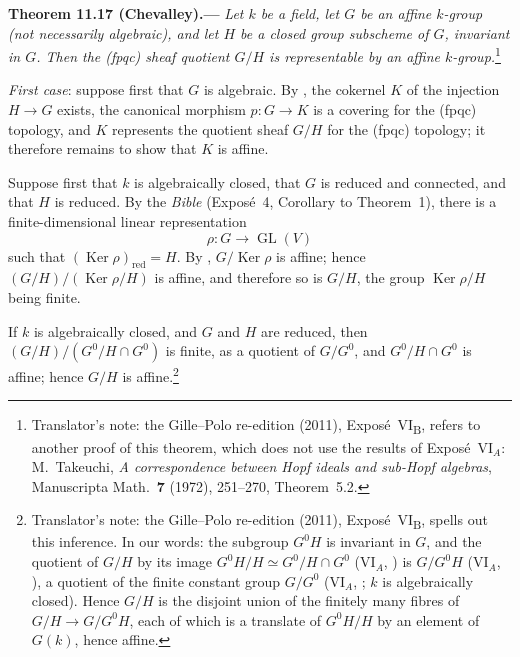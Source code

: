 
\medskip
{}\label{thm:sga3-VIB-11.17}%
\noindent\textbf{Theorem 11.17 \textup{(Chevalley)}.---}
\emph{Let \(k\) be a field, let \(G\) be an affine
\(k\)-group \textup{(not necessarily algebraic)}, and
let \(H\) be a closed group subscheme of \(G\), invariant
in \(G\). Then the \textup{(fpqc)} sheaf quotient \(G/H\)
is representable by an affine \(k\)-group.}\footnote{Translator's note: the Gille--Polo re-edition
(2011), Expos\'e~VI\textsubscript{B}, refers to another proof of this theorem, which does not use the results of
Expos\'e~VI\(_A\): M.~Takeuchi, \emph{A correspondence between Hopf ideals and sub-Hopf algebras}, Manuscripta
Math.\ \textbf{7} (1972), 251--270, Theorem~5.2.}

\emph{First case}: suppose first that \(G\) is algebraic. By
, the cokernel \(K\) of the injection
\(H\to G\) exists, the canonical morphism \(p:G\to K\) is a covering for the
\textup{(fpqc)} topology, and \(K\) represents the quotient sheaf \(G/H\) for the
\textup{(fpqc)} topology; it therefore remains to show that \(K\) is affine.

Suppose first that \(k\) is algebraically closed, that \(G\) is reduced and
connected, and that \(H\) is reduced. By the \emph{Bible} \textup{(Expos\'e~4,
Corollary to Theorem~1)}, there is a finite-dimensional linear representation
\[
  \rho:G\longrightarrow\operatorname{GL}(V)
\]
such that \((\operatorname{Ker}\rho)_{\mathrm{red}}=H\). By
, \(G/\operatorname{Ker}\rho\) is affine;
hence \((G/H)/(\operatorname{Ker}\rho/H)\) is affine, and therefore so is \(G/H\),
the group \(\operatorname{Ker}\rho/H\) being finite.

If \(k\) is algebraically closed, and \(G\) and \(H\) are reduced, then
\((G/H)/(G^0/H\cap G^0)\) is finite, as a quotient of \(G/G^0\), and
\(G^0/H\cap G^0\) is affine; hence \(G/H\) is affine.\footnote{Translator's note: the Gille--Polo
re-edition (2011), Expos\'e~VI\textsubscript{B}, spells out this inference. In our words: the subgroup \(G^0H\) is
invariant in \(G\), and the quotient of \(G/H\) by its image \(G^0H/H\simeq G^0/H\cap G^0\)
(VI\(_A\), ) is \(G/G^0H\)
(VI\(_A\), ), a quotient of the finite constant group \(G/G^0\)
(VI\(_A\), ; \(k\) is algebraically closed). Hence \(G/H\) is the disjoint
union of the finitely many fibres of \(G/H\to G/G^0H\), each of which is a translate of \(G^0H/H\) by an element of
\(G(k)\), hence affine.}

